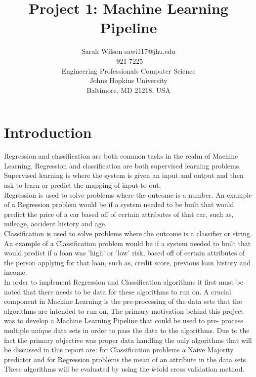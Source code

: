 \documentclass[twoside,11pt]{article}
\begin{document}
\title{Project 1: Machine Learning Pipeline}

\author{\name Sarah Wilson 
	   \email sawi117@jhu.edu \\
	   -921-7225 \\
       \addr Engineering Professionals Computer Science\\
       Johns Hopkins University\\
       Baltimore, MD 21218, USA} 

\maketitle


\section{Introduction}
Regression and classification are both common tasks in the realm of Machine Learning. Regression and classification are both supervised learning problems. Supervised learning is where the system is given an input and output and then ask to learn or predict the mapping of input to out.\\ \hspace*{10mm} Regression is used to solve problems where the outcome is a number. An example of a Regression problem would be if a system needed to be built that would predict the price of a car based off of certain attributes of that car, such as, mileage, accident history and age.\\
\hspace*{10mm} Classification is used to solve problems where the outcome is a classifier or string. An example of a Classification problem would be if a system needed to built that would predict if a loan was 'high' or 'low' risk, based off of certain attributes of the person applying for that loan, such as, credit score, previous loan history and income.\\ 
\hspace*{10mm} In order to implement Regression and Classification algorithms it first must be noted that there needs to be data for these algorithms to run on. A crucial component in Machine Learning is the pre-processing of the data sets that the algorithms are intended to run on. The primary motivation behind this project was to develop a Machine Learning Pipeline that could be used to pre- process multiple unique data sets in order to pass the data to the algorithms. Due to the fact the primary objective was proper data handling the only algorithms that will be discussed in this report are: for Classification problems a Naive Majority predictor and for Regression problems the mean of an attribute in the data sets. These algorithms will be evaluated by using the \textit{k}-fold cross validation method.\\
\end{document}
